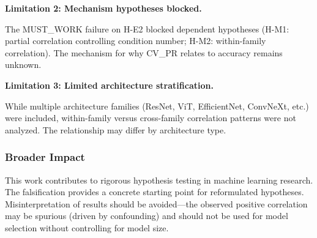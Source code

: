 \textbf{Limitation 2: Mechanism hypotheses blocked.}

The MUST\_WORK failure on H-E2 blocked dependent hypotheses (H-M1: partial correlation controlling condition number; H-M2: within-family correlation). The mechanism for why CV\_PR relates to accuracy remains unknown.

\textbf{Limitation 3: Limited architecture stratification.}

While multiple architecture families (ResNet, ViT, EfficientNet, ConvNeXt, etc.) were included, within-family versus cross-family correlation patterns were not analyzed. The relationship may differ by architecture type.

\subsubsection{Broader Impact}

This work contributes to rigorous hypothesis testing in machine learning research. The falsification provides a concrete starting point for reformulated hypotheses. Misinterpretation of results should be avoided---the observed positive correlation may be spurious (driven by confounding) and should not be used for model selection without controlling for model size.

